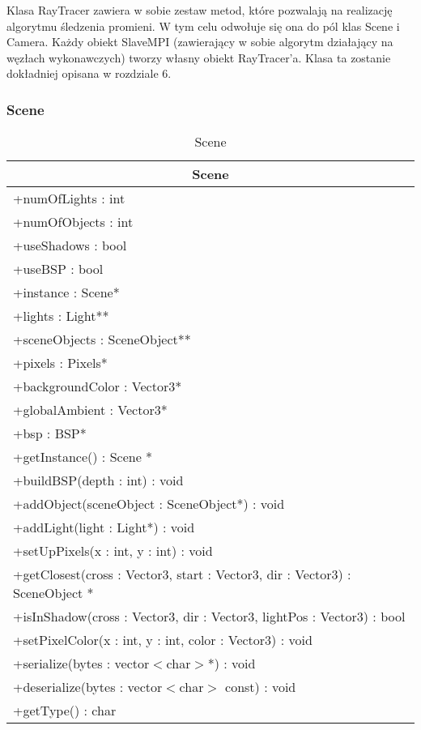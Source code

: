Klasa RayTracer zawiera w sobie zestaw metod, które pozwalają na realizację algorytmu śledzenia promieni. W tym celu odwołuje się ona do pól klas Scene i Camera. Każdy obiekt SlaveMPI (zawierający w sobie algorytm działający na węzłach wykonawczych) tworzy własny obiekt RayTracer'a. Klasa ta zostanie dokładniej opisana w rozdziale 6.

\subsubsection{Scene}

\footnotesize
\begin{longtable}{|p{14cm}|}
    \caption{Scene} \label{tab:Scene} \\ \hline
    \multicolumn{1}{|c|}{Scene} \\ \hline
    +numOfLights : int \\
    +numOfObjects : int \\
    +useShadows : bool \\
    +useBSP : bool \\
    +instance : Scene* \\
    +lights : Light** \\
    +sceneObjects : SceneObject** \\
    +pixels : Pixels* \\
    +backgroundColor : Vector3* \\
    +globalAmbient : Vector3* \\
    +bsp : BSP* \\
    \hline
	+getInstance() : Scene * \\
	+buildBSP(depth : int) : void \\
	+addObject(sceneObject : SceneObject*) : void \\
	+addLight(light : Light*) : void \\
	+setUpPixels(x : int, y : int) : void \\
	+getClosest(cross : Vector3, start : Vector3, dir : Vector3) : SceneObject * \\
	+isInShadow(cross : Vector3, dir : Vector3, lightPos : Vector3) : bool \\
	+setPixelColor(x : int, y : int, color : Vector3) : void \\
	+serialize(bytes : vector$<$char$>$*) : void \\
	+deserialize(bytes : vector$<$char$>$ const) : void \\
	+getType() : char \\
	\hline
\end{longtable}
\normalsize

